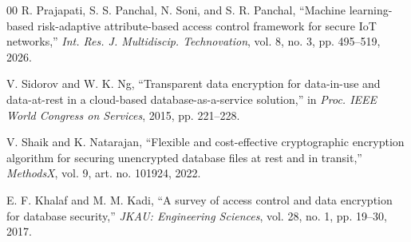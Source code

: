 \documentclass[a4paper,conference]{IEEEtran}
\begin{document}
\begin{thebibliography}{00}
 R. Prajapati, S. S. Panchal, N. Soni, and S. R. Panchal, ``Machine
learning-based risk-adaptive attribute-based access control framework for secure IoT networks,''
\emph{Int. Res. J. Multidiscip. Technovation}, vol. 8, no. 3, pp. 495--519, 2026.

 V. Sidorov and W. K. Ng, ``Transparent data encryption for data-in-use and
data-at-rest in a cloud-based database-as-a-service solution,'' in \emph{Proc. IEEE World
Congress on Services}, 2015, pp. 221--228.

 V. Shaik and K. Natarajan, ``Flexible and cost-effective cryptographic
encryption algorithm for securing unencrypted database files at rest and in transit,''
\emph{MethodsX}, vol. 9, art. no. 101924, 2022.

 E. F. Khalaf and M. M. Kadi, ``A survey of access control and data encryption
for database security,'' \emph{JKAU: Engineering Sciences}, vol. 28, no. 1, pp. 19--30, 2017.

\end{thebibliography}
\end{document}
